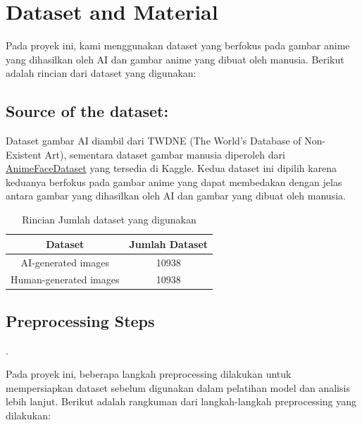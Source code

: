 \documentclass[12pt,a4paper]{article}
\begin{document}
\newpage

\section{Dataset and Material}
Pada proyek ini, kami menggunakan dataset yang berfokus pada gambar anime yang dihasilkan oleh AI dan gambar anime yang dibuat oleh manusia. Berikut adalah rincian dari dataset yang digunakan:

\subsection{Source of the dataset:}
Dataset gambar AI diambil dari TWDNE (The World's Database of Non-Existent Art), sementara dataset gambar manusia diperoleh dari \href{https://www.kaggle.com/datasets/splcher/animefacedataset}{AnimeFaceDataset} yang tersedia di Kaggle. Kedua dataset ini dipilih karena keduanya berfokus pada gambar anime yang dapat membedakan dengan jelas antara gambar yang dihasilkan oleh AI dan gambar yang dibuat oleh manusia.

\begin{table}[h!]
\centering
\begin{tabular}{|c|c|}
\hline
\textbf{Dataset} & \textbf{Jumlah Dataset} \\
\hline
AI-generated images & 10938 \\
\hline
Human-generated images & 10938\\
\hline
\end{tabular}
\caption{Rincian Jumlah dataset yang digunakan}
\label{table:dataset_sources}
\end{table}

    
\subsection{Preprocessing Steps}.

Pada proyek ini, beberapa langkah preprocessing dilakukan untuk mempersiapkan dataset sebelum digunakan dalam pelatihan model dan analisis lebih lanjut. Berikut adalah rangkuman dari langkah-langkah preprocessing yang dilakukan:
\end{document}
